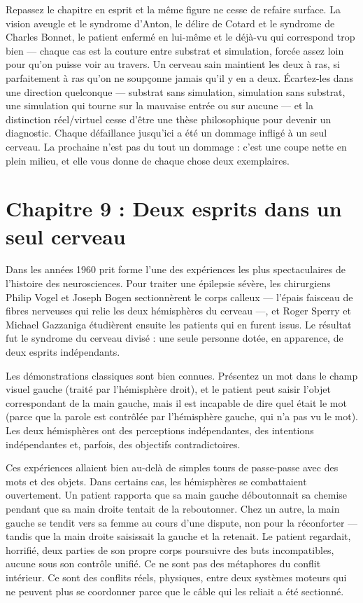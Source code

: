 \documentclass[11pt, twoside, openright]{book}
\begin{document}
Repassez le chapitre en esprit et la même figure ne cesse de refaire surface. La vision aveugle et le syndrome d'Anton, le délire de Cotard et le syndrome de Charles Bonnet, le patient enfermé en lui-même et le déjà-vu qui correspond trop bien --- chaque cas est la couture entre substrat et simulation, forcée assez loin pour qu'on puisse voir au travers. Un cerveau sain maintient les deux à ras, si parfaitement à ras qu'on ne soupçonne jamais qu'il y en a deux. Écartez-les dans une direction quelconque --- substrat sans simulation, simulation sans substrat, une simulation qui tourne sur la mauvaise entrée ou sur aucune --- et la distinction réel/\allowbreak{}virtuel cesse d'être une thèse philosophique pour devenir un diagnostic. Chaque défaillance jusqu'ici a été un dommage infligé à un seul cerveau. La prochaine n'est pas du tout un dommage : c'est une coupe nette en plein milieu, et elle vous donne de chaque chose deux exemplaires.


\chapter*{Chapitre 9 : Deux esprits dans un seul cerveau}

Dans les années 1960 prit forme l'une des expériences les plus spectaculaires de l'histoire des neurosciences. Pour traiter une épilepsie sévère, les chirurgiens Philip Vogel et Joseph Bogen sectionnèrent le corps calleux --- l'épais faisceau de fibres nerveuses qui relie les deux hémisphères du cerveau ---, et Roger Sperry et Michael Gazzaniga étudièrent ensuite les patients qui en furent issus. Le résultat fut le syndrome du cerveau divisé : une seule personne dotée, en apparence, de deux esprits indépendants.

Les démonstrations classiques sont bien connues. Présentez un mot dans le champ visuel gauche (traité par l'hémisphère droit), et le patient peut saisir l'objet correspondant de la main gauche, mais il est incapable de dire quel était le mot (parce que la parole est contrôlée par l'hémisphère gauche, qui n'a pas vu le mot). Les deux hémisphères ont des perceptions indépendantes, des intentions indépendantes et, parfois, des objectifs contradictoires.

Ces expériences allaient bien au-delà de simples tours de passe-passe avec des mots et des objets. Dans certains cas, les hémisphères se combattaient ouvertement. Un patient rapporta que sa main gauche déboutonnait sa chemise pendant que sa main droite tentait de la reboutonner. Chez un autre, la main gauche se tendit vers sa femme au cours d'une dispute, non pour la réconforter --- tandis que la main droite saisissait la gauche et la retenait. Le patient regardait, horrifié, deux parties de son propre corps poursuivre des buts incompatibles, aucune sous son contrôle unifié. Ce ne sont pas des métaphores du conflit intérieur. Ce sont des conflits réels, physiques, entre deux systèmes moteurs qui ne peuvent plus se coordonner parce que le câble qui les reliait a été sectionné.
\end{document}
